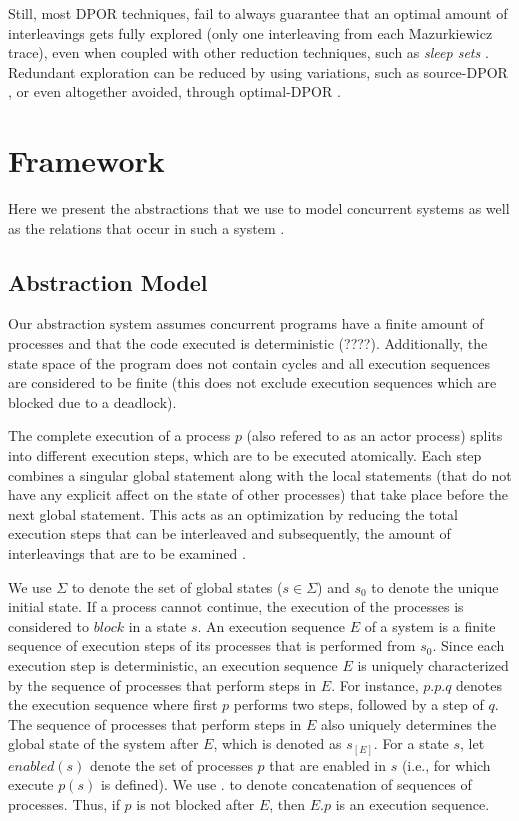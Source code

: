 Still, most DPOR techniques, fail to always guarantee that an optimal amount of interleavings gets fully explored (only one 
interleaving from each Mazurkiewicz trace), 
even when coupled with other reduction techniques, such as \textit{sleep sets} \cite{Godefroid1996}. Redundant exploration
can be reduced by using variations, such as source-DPOR \cite{AbdullaAronisJohnssonSagonasDPOR2014}, or even altogether avoided, through optimal-DPOR 
\cite{AbdullaAronisJohnssonSagonasDPOR2014}.

\section{Framework}

Here we present the abstractions that we use to model concurrent systems as well as the relations that
occur in such a system \cite{AbdullaAronisJohnssonSagonasDPOR2014}.

\subsection{Abstraction Model}

Our abstraction system assumes concurrent programs have a finite amount of processes and that
the code executed is deterministic (????). Additionally, the state space of the program does not
contain cycles and all execution sequences are considered to be finite (this does not exclude
execution sequences which are blocked due to a deadlock).

The complete execution of a process $p$ (also refered to as an actor process) splits into different execution steps, which are to be 
executed atomically. Each step combines a singular global statement along with the local statements
(that do not have any explicit affect on the state of other processes) that take place before the next
global statement. This acts as an optimization by reducing the total execution steps that can be
interleaved and subsequently, the amount of interleavings that are to be examined \cite{Godefroid:1997:MCP:263699.263717}. 

We use $\Sigma$ to denote the set of global states ($s\in\Sigma$) and $s_0$ to 
denote the unique initial state. If a process cannot continue, the execution 
of the processes is considered to $block$ in a state $s$.
An execution sequence $E$ of a system is a finite sequence of
execution steps of its processes that is performed from $s_0$. Since each execution step is 
deterministic, an execution sequence $E$ is uniquely characterized by the sequence of processes
that perform steps in $E$. For instance, $p.p.q$ denotes the execution
sequence where first $p$ performs two steps, followed by a step of $q$.
The sequence of processes that perform steps in $E$ also uniquely
determines the global state of the system after $E$, which is denoted as
$s_{[E]}$. For a state $s$, let $enabled(s)$ denote the set of processes $p$ that
are enabled in $s$ (i.e., for which execute $p(s)$ is defined). We use $.$ to
denote concatenation of sequences of processes. Thus, if $p$ is not
blocked after $E$, then $E.p$ is an execution sequence.

